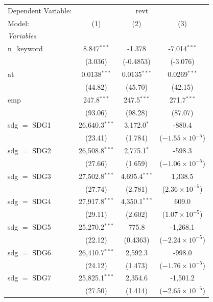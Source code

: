 
\begingroup
\centering
\begin{tabular}{lccc}
   \tabularnewline \midrule \midrule
   Dependent Variable: & \multicolumn{3}{c}{revt}\\
   Model:        & (1)              & (2)             & (3)\\  
   \midrule
   \emph{Variables}\\
   n\_keyword    & 8.847$^{***}$    & -1.378          & -7.014$^{***}$\\   
                 & (3.036)          & (-0.4853)       & (-3.076)\\   
   at            & 0.0138$^{***}$   & 0.0135$^{***}$  & 0.0269$^{***}$\\   
                 & (44.82)          & (45.70)         & (42.15)\\   
   emp           & 247.8$^{***}$    & 247.5$^{***}$   & 271.7$^{***}$\\   
                 & (93.06)          & (98.28)         & (87.07)\\   
   sdg $=$ SDG1  & 26,640.3$^{***}$ & 3,172.0$^{*}$   & -880.4\\   
                 & (23.41)          & (1.784)         & ($-1.55\times 10^{-5}$)\\    
   sdg $=$ SDG2  & 26,508.8$^{***}$ & 2,775.1$^{*}$   & -598.3\\   
                 & (27.66)          & (1.659)         & ($-1.06\times 10^{-5}$)\\    
   sdg $=$ SDG3  & 27,502.8$^{***}$ & 4,695.4$^{***}$ & 1,338.5\\   
                 & (27.74)          & (2.781)         & ($2.36\times 10^{-5}$)\\    
   sdg $=$ SDG4  & 27,917.8$^{***}$ & 4,350.1$^{***}$ & 609.0\\   
                 & (29.11)          & (2.602)         & ($1.07\times 10^{-5}$)\\    
   sdg $=$ SDG5  & 25,270.2$^{***}$ & 775.8           & -1,268.1\\   
                 & (22.12)          & (0.4363)        & ($-2.24\times 10^{-5}$)\\    
   sdg $=$ SDG6  & 26,410.7$^{***}$ & 2,592.3         & -998.0\\   
                 & (24.12)          & (1.473)         & ($-1.76\times 10^{-5}$)\\    
   sdg $=$ SDG7  & 25,825.1$^{***}$ & 2,354.6         & -1,501.2\\   
                 & (27.50)          & (1.414)         & ($-2.65\times 10^{-5}$)\\    

\end{tabular}
